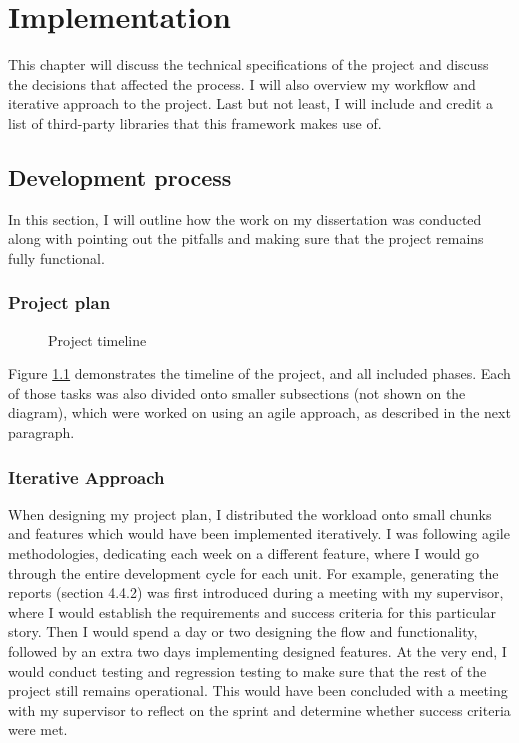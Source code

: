\chapter{Implementation\label{chap:implementation}}
This chapter will discuss the technical specifications of the project and discuss the decisions that affected the process. I will also overview my workflow and iterative approach to the project. Last but not least, I will include and credit a list of third-party libraries that this framework makes use of.

\section{Development process}

In this section, I will outline how the work on my dissertation was conducted along with pointing out the pitfalls and making sure that the project remains fully functional.

\subsection{Project plan}

\begin{figure}[h]
    \centering
    \caption{Project timeline}
    \label{fig:timeline}
\end{figure}

Figure \ref{fig:timeline} demonstrates the timeline of the project, and all included phases. Each of those tasks was also divided onto smaller subsections (not shown on the diagram), which were worked on using an agile approach, as described in the next paragraph.

\subsection{Iterative Approach}

When designing my project plan, I distributed the workload onto small chunks and features which would have been implemented iteratively. I was following agile methodologies, dedicating each week on a different feature, where I would go through the entire development cycle for each unit. For example, generating the reports (section 4.4.2) was first introduced during a meeting with my supervisor, where I would establish the requirements and success criteria for this particular story. Then I would spend a day or two designing the flow and functionality, followed by an extra two days implementing designed features. At the very end, I would conduct testing and regression testing to make sure that the rest of the project still remains operational. This would have been concluded with a meeting with my supervisor to reflect on the sprint and determine whether success criteria were met.

